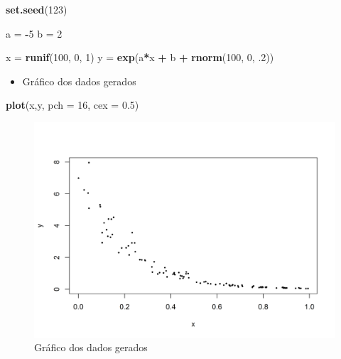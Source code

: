 \documentclass[a4paper]{article}
\newenvironment{Shaded}{\begin{snugshade}}{\end{snugshade}}
\newcommand{\KeywordTok}[1]{\textcolor[rgb]{0.13,0.29,0.53}{\textbf{#1}}}
\newcommand{\DataTypeTok}[1]{\textcolor[rgb]{0.13,0.29,0.53}{#1}}
\newcommand{\DecValTok}[1]{\textcolor[rgb]{0.00,0.00,0.81}{#1}}
\newcommand{\FloatTok}[1]{\textcolor[rgb]{0.00,0.00,0.81}{#1}}
\newcommand{\StringTok}[1]{\textcolor[rgb]{0.31,0.60,0.02}{#1}}
\newcommand{\OperatorTok}[1]{\textcolor[rgb]{0.81,0.36,0.00}{\textbf{#1}}}
\newcommand{\NormalTok}[1]{#1}
\providecommand{\tightlist}{%
  \setlength{\itemsep}{0pt}\setlength{\parskip}{0pt}}
\begin{document}
\begin{Shaded}
\begin{Highlighting}[]
\KeywordTok{set.seed}\NormalTok{(}\DecValTok{123}\NormalTok{)}

\NormalTok{a =}\StringTok{ }\OperatorTok{-}\DecValTok{5}
\NormalTok{b =}\StringTok{ }\DecValTok{2}

\NormalTok{x =}\StringTok{ }\KeywordTok{runif}\NormalTok{(}\DecValTok{100}\NormalTok{, }\DecValTok{0}\NormalTok{, }\DecValTok{1}\NormalTok{)}
\NormalTok{y =}\StringTok{ }\KeywordTok{exp}\NormalTok{(a}\OperatorTok{*}\NormalTok{x }\OperatorTok{+}\StringTok{ }\NormalTok{b }\OperatorTok{+}\StringTok{ }\KeywordTok{rnorm}\NormalTok{(}\DecValTok{100}\NormalTok{, }\DecValTok{0}\NormalTok{, .}\DecValTok{2}\NormalTok{))}
\end{Highlighting}
\end{Shaded}

\begin{itemize}
\tightlist
\item
  Gráfico dos dados gerados
\end{itemize}

\begin{Shaded}
\begin{Highlighting}[]
\KeywordTok{plot}\NormalTok{(x,y, }\DataTypeTok{pch =} \DecValTok{16}\NormalTok{, }\DataTypeTok{cex =} \FloatTok{0.5}\NormalTok{)}
\end{Highlighting}
\end{Shaded}

\begin{figure}[H]

{\centering \includegraphics[width=0.7\linewidth]{images/grafico-1} 

}

\caption{Gráfico dos dados gerados}\label{fig:grafico}
\end{figure}
\end{document}
